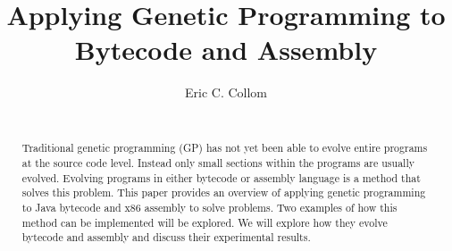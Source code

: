 \documentclass{sig-alternate}
\begin{document}
%

\title{Applying Genetic Programming to \\ Bytecode and Assembly}
%
%
%
%
%
%
\author{
%
%
\alignauthor
Eric C. Collom \\
 \\
}

\maketitle
\begin{abstract}
Traditional genetic programming (GP) has not yet been able to evolve entire programs at the source code level. Instead only small sections within the programs are usually evolved. Evolving programs in either bytecode or assembly language is a method that solves this problem. This paper provides an overview of applying genetic programming to Java bytecode and x86 assembly to solve problems. Two examples of how this method can be implemented will be explored. We will explore how they evolve bytecode and assembly and discuss their experimental results.
\end{abstract}
\end{document}
